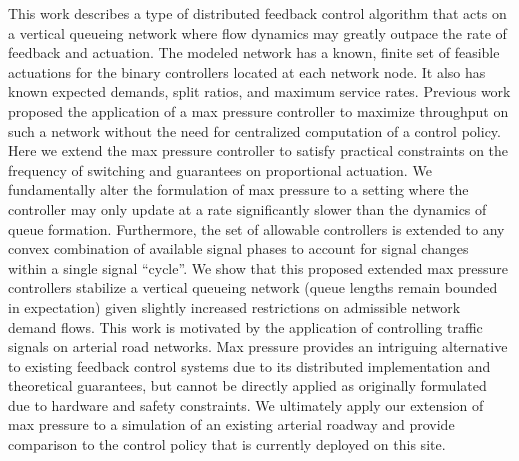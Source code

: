 \begin{footnotesize}
This work describes a type of distributed feedback control algorithm that acts on a vertical queueing network where flow dynamics may greatly outpace the rate of feedback and actuation. The modeled network has a known, finite set of feasible actuations for the binary controllers located at each network node. It also has known expected demands, split ratios, and maximum service rates. Previous work proposed the application of a max pressure controller to maximize throughput on such a network without the need for centralized computation of a control policy. Here we extend the max pressure controller to satisfy practical constraints on the frequency of switching and guarantees on proportional actuation. We fundamentally alter the formulation of max pressure to a setting where the controller may only update at a rate significantly slower than the dynamics of queue formation. Furthermore, the set of allowable controllers is extended to any convex combination of available signal phases to account for signal changes within a single signal ``cycle''. We show that this proposed extended max pressure controllers stabilize a vertical queueing network (queue lengths remain bounded in expectation) given slightly increased restrictions on admissible network demand flows.  
This work is motivated by the application of controlling traffic signals on arterial road networks. Max pressure provides an intriguing alternative to existing feedback control systems due to its distributed implementation and theoretical guarantees, but cannot be directly applied as originally formulated due to hardware and safety constraints. We ultimately apply our extension of max pressure to a simulation of an existing arterial roadway and provide comparison to the control policy that is currently deployed on this site. 
\end{footnotesize}

